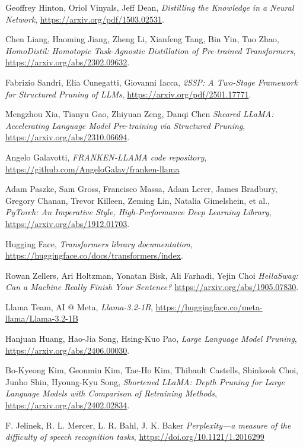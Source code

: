 \begin{thebibliography}{9}
	Geoffrey Hinton, Oriol Vinyals, Jeff Dean,
	\textit{Distilling the Knowledge in a Neural Network},
	\url{https://arxiv.org/pdf/1503.02531}.
	
	Chen Liang, Haoming Jiang, Zheng Li, Xianfeng Tang, Bin Yin, Tuo Zhao,
	\textit{HomoDistil: Homotopic Task-Agnostic Distillation of Pre-trained Transformers},
	\url{https://arxiv.org/abs/2302.09632}.

	Fabrizio Sandri, Elia Cunegatti, Giovanni Iacca,
	\textit{2SSP: A Two-Stage Framework for Structured Pruning of LLMs},
	\url{https://arxiv.org/pdf/2501.17771}.

	Mengzhou Xia, Tianyu Gao, Zhiyuan Zeng, Danqi Chen
	\textit{Sheared LLaMA: Accelerating Language Model Pre-training via Structured Pruning},
	\url{https://arxiv.org/abs/2310.06694}.

	Angelo Galavotti,
	\textit{FRANKEN-LLAMA code repository},
	\url{https://github.com/AngeloGalav/franken-llama}

	Adam Paszke, Sam Gross, Francisco Massa, Adam Lerer, James Bradbury, Gregory Chanan, Trevor Killeen, Zeming Lin, Natalia Gimelshein, et al.,
	\textit{PyTorch: An Imperative Style, High-Performance Deep Learning Library},
	\url{https://arxiv.org/abs/1912.01703}.

	Hugging Face,
	\textit{Transformers library documentation},
	\url{https://huggingface.co/docs/transformers/index}.

	Rowan Zellers, Ari Holtzman, Yonatan Bisk, Ali Farhadi, Yejin Choi
	\textit{HellaSwag: Can a Machine Really Finish Your Sentence?}
	\url{https://arxiv.org/abs/1905.07830}.

	Llama Team, AI @ Meta,
	\textit{Llama-3.2-1B},
	\url{https://huggingface.co/meta-llama/Llama-3.2-1B}

	Hanjuan Huang, Hao-Jia Song, Hsing-Kuo Pao,
	\textit{Large Language Model Pruning},
	\url{https://arxiv.org/abs/2406.00030}.

	Bo-Kyeong Kim, Geonmin Kim, Tae-Ho Kim, Thibault Castells, Shinkook Choi, Junho Shin, Hyoung-Kyu Song,
	\textit{Shortened LLaMA: Depth Pruning for Large Language Models with Comparison of Retraining Methods},
	\url{https://arxiv.org/abs/2402.02834}.

	F. Jelinek, R. L. Mercer, L. R. Bahl, J. K. Baker
	\textit{Perplexity—a measure of the difficulty of speech recognition tasks},
	\url{https://doi.org/10.1121/1.2016299}


\end{thebibliography}
